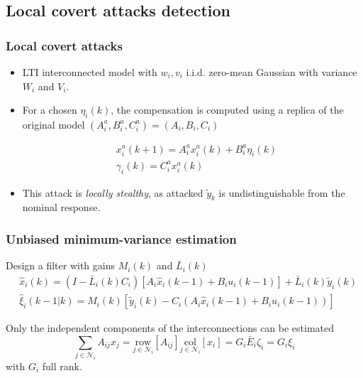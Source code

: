\documentclass[presentation]{beamer}
\newcommand{\NN}{{\mathcal{N}}}
\newcommand{\col}[1]{\underset{{#1}}{\mathrm{col}}}
\newcommand{\row}[1]{\underset{{#1}}{\mathrm{row}}}
\begin{document}
\subsection{Local covert attacks detection}

\begin{frame}
	\frametitle{Local covert attacks}

	\begin{itemize}
		\setlength{\itemsep}{2ex}
		\item<1-> LTI interconnected model with $w_i, v_i$ i.i.d. zero-mean Gaussian with variance $W_i$ and $V_i$.
		
		\item<2-> For a chosen $\eta_i(k)$, the compensation is computed using a replica of the original model $(A_i^a, B_i^a, C_i^a) = (A_i,B_i,C_i)$
		
		\begin{equation*}
			\begin{aligned}
				&x^{a}_i(k+1) = A^a_i x^a_i(k) + B^a_i \eta_i(k) \\
				&\gamma_i(k) = C^a_i x^a_i(k) \,
			\end{aligned}
		\end{equation*}

		\item<3> This attack is \emph{locally stealthy}, as attacked $\tilde y_k$ is undistinguishable from the nominal response.
	\end{itemize}
\end{frame}

\begin{frame}
	\frametitle{Unbiased minimum-variance estimation}
	Design a filter with gains $M_i(k)$ and $\bar L_i(k)$
	\begin{align*}
		&\hat{x}_i(k) =  (I - \bar L_i(k)C_i)\left[A_i\hat{x}_i(k-1) + B_i u_i(k-1)\right] +\bar L_i(k) \tilde y_i(k) \\
		&\hat{\xi}_i(k-1|k) = M_i(k)\left[\tilde{y}_i(k) - C_i \left(A_i\hat{x}_i(k-1) + B_i u_i(k-1)	\right) \right]
	\end{align*}
	
	\vfill
	Only the independent components of the interconnections can be estimated
	$$
		\sum_{j\in\mathcal{N}_i}A_{ij} x_j = \row{j\in\NN_i}\left[A_{ij}\right]\col{j\in\NN_i}\left[x_i\right] = G_i \bar{E}_i \zeta_i = G_i \xi_i
	$$
	with $G_i$ full rank.
\end{frame}
\end{document}
